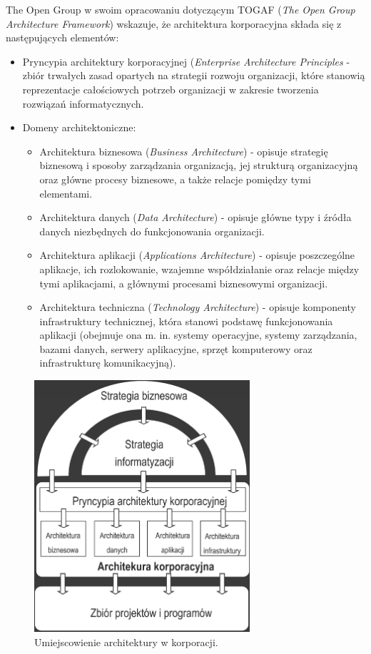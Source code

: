 The Open Group w swoim opracowaniu dotyczącym TOGAF (\emph{The Open Group Architecture Framework}) wskazuje, że architektura korporacyjna składa się z następujących elementów:
\begin{itemize}
\item{Pryncypia architektury korporacyjnej (\textit{Enterprise Architecture Principles} - zbiór trwałych zasad opartych na strategii rozwoju organizacji, które stanowią reprezentacje całościowych potrzeb organizacji w zakresie tworzenia rozwiązań informatycznych.}
\item{Domeny architektoniczne:
\begin{itemize}
\item{Architektura biznesowa (\textit{Business Architecture}) - opisuje strategię biznesową i sposoby zarządzania organizacją, jej strukturą organizacyjną oraz główne procesy biznesowe, a także relacje pomiędzy tymi elementami.}
\item{Architektura danych (\textit{Data Architecture}) - opisuje główne typy i źródła danych niezbędnych do funkcjonowania organizacji.}
\item{Architektura aplikacji (\textit{Applications Architecture}) - opisuje poszczególne aplikacje, ich rozlokowanie, wzajemne współdziałanie oraz relacje między tymi aplikacjami, a głównymi procesami biznesowymi organizacji.}
\item{Architektura techniczna (\textit{Technology Architecture}) - opisuje komponenty infrastruktury technicznej, która stanowi podstawę funkcjonowania aplikacji (obejmuje ona m. in. systemy operacyjne, systemy zarządzania, bazami danych, serwery aplikacyjne, sprzęt komputerowy oraz infrastrukturę komunikacyjną).}
\end{itemize}
}
\end{itemize}

\begin{figure}[h!tbp]
\begin{centering}
\includegraphics[width=8cm]{img/ea.png}
\caption[Umiejscowienie architektury w korporacji.]{Umiejscowienie architektury w korporacji. \cite{SOMAArsIBMJour}}\label{ea_arch}
\end{centering}
\end{figure}


